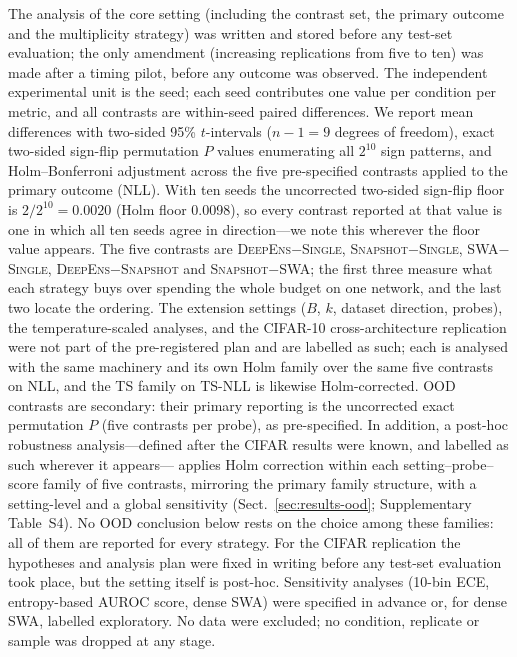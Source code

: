 \documentclass[11pt,a4paper]{article}
\newcommand{\deepens}{\textsc{DeepEns}}
\newcommand{\snapshot}{\textsc{Snapshot}}
\newcommand{\swa}{\textsc{SWA}}
\newcommand{\single}{\textsc{Single}}
\newcommand{\ts}{\textsc{TS}}
\begin{document}
The analysis of the core setting (including the contrast set, the primary
outcome and the multiplicity strategy) was written and stored before any
test-set evaluation; the only amendment (increasing replications from five
to ten) was made after a timing pilot, before any outcome was observed.
The independent experimental unit is the seed; each seed contributes one
value per condition per metric, and all contrasts are within-seed paired
differences. We report mean differences with two-sided 95\% $t$-intervals
($n-1=9$ degrees of freedom), exact two-sided sign-flip permutation $P$
values enumerating all $2^{10}$ sign patterns, and Holm--Bonferroni
adjustment across the five pre-specified contrasts applied to the primary
outcome (NLL). With ten seeds the uncorrected two-sided sign-flip floor is
$2/2^{10}=0.0020$ (Holm floor 0.0098), so every contrast reported at that
value is one in which all ten seeds agree in direction---we note this
wherever the floor value appears. The five contrasts are \deepens$-$\single,
\snapshot$-$\single, \swa$-$\single, \deepens$-$\snapshot{} and
\snapshot$-$\swa{}; the first three measure what each strategy buys over
spending the whole budget on one network, and the last two locate the
ordering. The extension settings ($B$, $k$, dataset direction, probes), the
temperature-scaled analyses, and the CIFAR-10 cross-architecture
replication were not part of the pre-registered plan and are labelled as
such; each is analysed with the same machinery and its own Holm family over
the same five contrasts on NLL, and the \ts{} family on \ts-NLL is likewise
Holm-corrected. OOD contrasts are secondary: their primary reporting is the
uncorrected exact permutation $P$ (five contrasts per probe), as
pre-specified. In addition, a post-hoc robustness analysis---defined after
the CIFAR results were known, and labelled as such wherever it appears---
applies Holm correction within each setting--probe--score family of five
contrasts, mirroring the primary family structure, with a setting-level and
a global sensitivity (Sect.~\ref{sec:results-ood}; Supplementary
Table~S4). No OOD conclusion below rests on the choice among these
families: all of them are reported for every strategy. For the CIFAR replication the hypotheses and analysis plan
were fixed in writing before any test-set evaluation took place, but the
setting itself is post-hoc. Sensitivity analyses (10-bin ECE, entropy-based
AUROC score, dense \swa{}) were specified in advance or, for dense \swa{},
labelled exploratory. No data were excluded; no condition, replicate or
sample was dropped at any stage.
\end{document}
